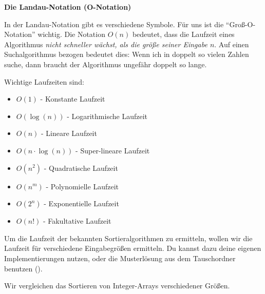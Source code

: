 \documentclass[11pt, a4paper, ngerman]{arbeitsblatt}
\begin{document}
\ReiheTitel

\begin{infobox}\small
	\textbf{Die Landau-Notation (O-Notation)}

	In der Landau-Notation gibt es verschiedene Symbole. Für uns ist die
	\enquote{Groß-O-Notation} wichtig. Die Notation $O(n)$ bedeutet,
	dass die Laufzeit eines Algorithmus \emph{nicht schneller wächst, als die größe
	seiner Eingabe $n$}. Auf einen Suchalgorithmus bezogen
	bedeutet dies: Wenn ich in doppelt so vielen Zahlen suche, dann braucht der
	Algorithmus ungefähr doppelt so lange.

	\smallskip
	Wichtige Laufzeiten sind:\vspace{-1ex}
	\begin{multicols}{2}
		\begin{itemize}
			\item $O(1)$ - Konstante Laufzeit
			\item $O(\log(n))$ - Logarithmische Laufzeit
			\item $O(n)$ - Lineare Laufzeit
			\item $O(n\cdot\log(n))$ - Super-lineare Laufzeit
			\item $O(n^2)$ - Quadratische Laufzeit
			\item $O(n^m)$ - Polynomielle Laufzeit
			\item $O(2^n)$ - Exponentielle Laufzeit
			\item $O(n!)$ - Fakultative Laufzeit
		\end{itemize}
	\end{multicols}
	\smallskip
\end{infobox}

Um die Laufzeit der bekannten Sortieralgorithmen zu ermitteln, wollen wir die
Laufzeit für verschiedene Eingabegrößen ermitteln. Du kannst dazu deine eigenen
Implementierungen nutzen, oder die Musterlösung aus dem Tauschordner benutzen
().


Wir vergleichen das Sortieren von Integer-Arrays verschiedener Größen.
\end{document}
